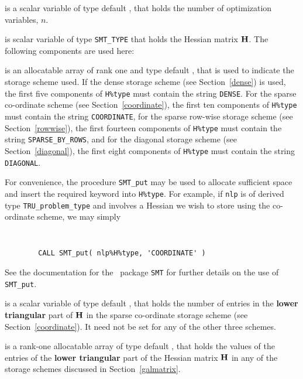 \documentclass{galahad}
\newcommand{\packagename}{TRU}
\begin{document}
\begin{description}

 is a scalar variable of type default \integer,
 that holds the number of optimization variables, $n$.

 is scalar variable of type {\tt SMT\_TYPE}
that holds the Hessian matrix ${\mathbf{H}}$. The following components
are used here:

\begin{description}

 is an allocatable array of rank one and type default
\character, that
is used to indicate the storage scheme used. If the dense storage scheme
(see Section~\ref{dense}) is used,
the first five components of {\tt H\%type} must contain the
string {\tt DENSE}.
For the sparse co-ordinate scheme (see Section~\ref{coordinate}),
the first ten components of {\tt H\%type} must contain the
string {\tt COORDINATE},
for the sparse row-wise storage scheme (see Section~\ref{rowwise}),
the first fourteen components of {\tt H\%type} must contain the
string {\tt SPARSE\_BY\_ROWS},
and for the diagonal storage scheme (see Section~\ref{diagonal}),
the first eight components of {\tt H\%type} must contain the
string {\tt DIAGONAL}.

For convenience, the procedure {\tt SMT\_put}
may be used to allocate sufficient space and insert the required keyword
into {\tt H\%type}.
For example, if {\tt nlp} is of derived type {\tt \packagename\_problem\_type}
and involves a Hessian we wish to store using the co-ordinate scheme,
we may simply
{\tt
\begin{verbatim}
        CALL SMT_put( nlp%H%type, 'COORDINATE' )
\end{verbatim}
}
\noindent
See the documentation for the \galahad\ package {\tt SMT}
for further details on the use of {\tt SMT\_put}.

 is a scalar variable of type default \integer, that
holds the number of entries in the {\bf lower triangular} part of ${\mathbf{H}}$
in the sparse co-ordinate storage scheme (see Section~\ref{coordinate}).
It need not be set for any of the other three schemes.

 is a rank-one allocatable array of type default \realdp, that holds
the values of the entries of the {\bf lower triangular} part
of the Hessian matrix ${\mathbf{H}}$ in any of the
storage schemes discussed in Section~\ref{galmatrix}.


\end{description}
\end{description}
\end{document}
